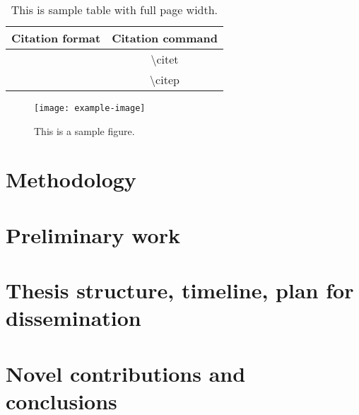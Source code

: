 \documentclass[10pt]{article}
\begin{document}
\begin{multicols*}{2}


\begin{table*}
        \centering
        \begin{tabular}{cc}
                \hline
                \textbf{Citation format} & \textbf{Citation command} \\
                \hline
                \citet{APA:83} & \textbackslash{}citet{} \\
                \citep{APA:83} & \textbackslash{}citep{} \\
                \hline
        \end{tabular}
        \caption{This is sample table with full page width.}
        \label{tbl:tbl1}
\end{table*}

\begin{figure}[H]
    \centering
        \texttt{[image: example-image]}
        \caption{This is a sample figure.}
        \label{fig:fig1}
\end{figure}

\section{Methodology}

\section{Preliminary work}

\section{Thesis structure, timeline, plan for dissemination}

\section{Novel contributions and conclusions}

\end{multicols*}

\clearpage



\end{document}

